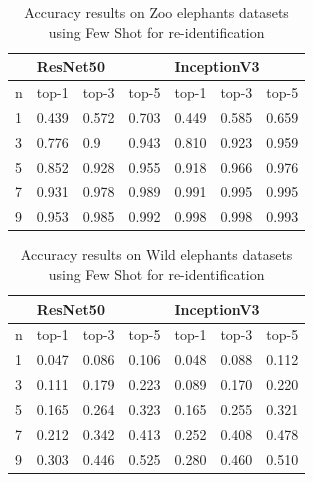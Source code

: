 \documentclass[10pt,twocolumn,letterpaper]{article}
\begin{document}
\begin{table}[]
\begin{tabular}{@{}lllllll@{}}
\toprule
                       & \multicolumn{3}{l}{ResNet50}               & \multicolumn{3}{l}{InceptionV3} \\ \midrule
\multicolumn{1}{l|}{n} & top-1 & top-3 & \multicolumn{1}{l|}{top-5} & top-1     & top-3    & top-5    \\ \midrule
\multicolumn{1}{l|}{1} & 0.439 & 0.572 & \multicolumn{1}{l|}{0.703} & 0.449     & 0.585    & 0.659    \\
\multicolumn{1}{l|}{3} & 0.776 & 0.9   & \multicolumn{1}{l|}{0.943} & 0.810     & 0.923    & 0.959    \\
\multicolumn{1}{l|}{5} & 0.852 & 0.928 & \multicolumn{1}{l|}{0.955} & 0.918     & 0.966    & 0.976    \\
\multicolumn{1}{l|}{7} & 0.931 & 0.978 & \multicolumn{1}{l|}{0.989} & 0.991     & 0.995    & 0.995    \\
\multicolumn{1}{l|}{9} & 0.953 & 0.985 & \multicolumn{1}{l|}{0.992} & 0.998     & 0.998    & 0.993   
\end{tabular}
\caption{Accuracy results on Zoo elephants datasets using Few Shot for re-identification}
\label{tab:few-shot-results}
\end{table}


\begin{table}[]
\begin{tabular}{@{}lllllll@{}}
\toprule
                       & \multicolumn{3}{l}{ResNet50}               & \multicolumn{3}{l}{InceptionV3} \\ \midrule
\multicolumn{1}{l|}{n} & top-1 & top-3 & \multicolumn{1}{l|}{top-5} & top-1     & top-3    & top-5    \\ \midrule
\multicolumn{1}{l|}{1} & 0.047 & 0.086 & \multicolumn{1}{l|}{0.106} & 0.048     & 0.088    & 0.112    \\
\multicolumn{1}{l|}{3} & 0.111 & 0.179 & \multicolumn{1}{l|}{0.223} & 0.089     & 0.170    & 0.220    \\
\multicolumn{1}{l|}{5} & 0.165 & 0.264 & \multicolumn{1}{l|}{0.323} & 0.165     & 0.255    & 0.321    \\
\multicolumn{1}{l|}{7} & 0.212 & 0.342 & \multicolumn{1}{l|}{0.413} & 0.252     & 0.408    & 0.478    \\
\multicolumn{1}{l|}{9} & 0.303 & 0.446 & \multicolumn{1}{l|}{0.525} & 0.280     & 0.460    & 0.510   
\end{tabular}
\caption{Accuracy results on Wild elephants datasets using Few Shot for re-identification}
\label{tab:few-shot-results-wild}
\end{table}
\end{document}
